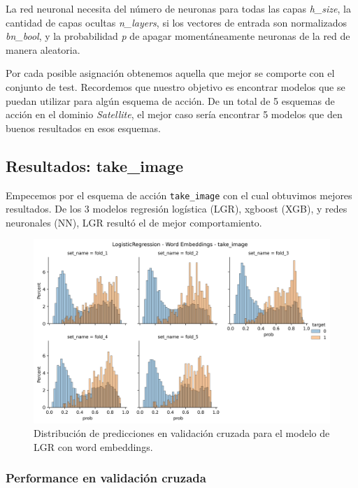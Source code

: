 La red neuronal necesita del número de neuronas para todas las capas
\emph{h\_size}, la cantidad de capas ocultas \emph{n\_layers}, si los vectores
de entrada son normalizados \emph{bn\_bool}, y la probabilidad  \emph{p} de
apagar momentáneamente neuronas de la red de manera aleatoria.

Por cada posible asignación obtenemos aquella que mejor se comporte con el
conjunto de test. Recordemos que nuestro objetivo es encontrar modelos que se
puedan utilizar para algún esquema de acción. De un total de 5 esquemas de
acción en el dominio \emph{Satellite}, el mejor caso sería encontrar 5 modelos
que den buenos resultados en esos esquemas.

\subsection{Resultados: take\_image}

Empecemos por el esquema de acción \verb|take_image| con el cual obtuvimos
mejores resultados. De los 3 modelos regresión logística (LGR), xgboost (XGB), y
redes neuronales (NN), LGR resultó el de mejor comportamiento.

\begin{figure}[t!]
    \centering
    \includegraphics[width=\linewidth]{figures/results/word_embeddings/lgr/take_image/lgr_wb_take_image.png}
    \caption{Distribución de predicciones en validación cruzada para el modelo de LGR con word embeddings.}
    \label{fig:takeimage-bestmodel-distplot}
\end{figure}

\subsubsection{Performance en validación cruzada}

